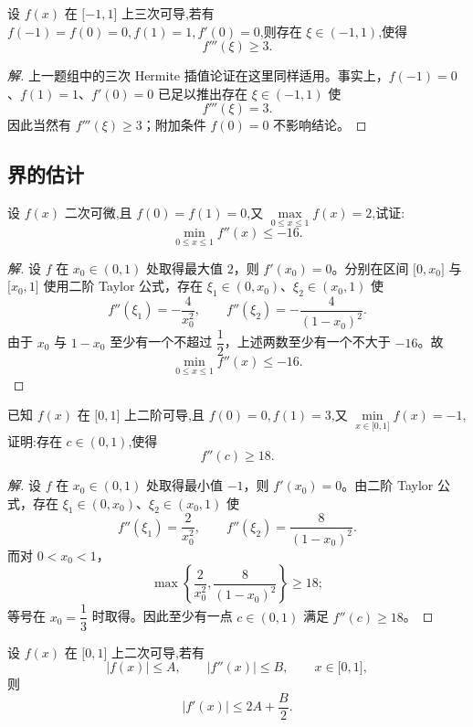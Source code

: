 \documentclass[../../数学分析培优讲义(答案版).tex]{subfiles}
\begin{document}
\begin{example}
设 $f(x)$ 在 $\lbrack -1,1\rbrack$ 上三次可导,若有 $f(-1)=f(0)=0,f(1)=1,f'(0)=0$,则存在 $\xi\in(-1,1)$,使得
\[
    f'''(\xi)\geq 3.
\]
\end{example}

\begin{proof}[解]
上一题组中的三次 Hermite 插值论证在这里同样适用。事实上，$f(-1)=0$、$f(1)=1$、$f'(0)=0$ 已足以推出存在 $\xi\in(-1,1)$ 使
\[
    f'''(\xi)=3.
\]
因此当然有 $f'''(\xi)\geq3$；附加条件 $f(0)=0$ 不影响结论。
\end{proof}

\subsection{界的估计}

\begin{example}
设 $f(x)$ 二次可微,且 $f(0)=f(1)=0$,又
$\displaystyle\max\limits_{0\leq x\leq1}f(x)=2$,试证:
\[
    \min\limits_{0\leq x\leq1}f''(x)\leq-16.
\]
\end{example}

\begin{proof}[解]
设 $f$ 在 $x_0\in(0,1)$ 处取得最大值 $2$，则 $f'(x_0)=0$。分别在区间 $\lbrack0,x_0\rbrack$ 与 $\lbrack x_0,1\rbrack$ 使用二阶 Taylor 公式，存在 $\xi_1\in(0,x_0)$、$\xi_2\in(x_0,1)$ 使
\[
    f''(\xi_1)=-\dfrac{4}{x_0^2},
    \qquad
    f''(\xi_2)=-\dfrac{4}{(1-x_0)^2}.
\]
由于 $x_0$ 与 $1-x_0$ 至少有一个不超过 $\dfrac{1}{2}$，上述两数至少有一个不大于 $-16$。故
\[
    \min\limits_{0\leq x\leq1}f''(x)\leq-16.
\]
\end{proof}

\begin{example}
已知 $f(x)$ 在 $\lbrack 0,1\rbrack$ 上二阶可导,且 $f(0)=0,f(1)=3$,又
$\displaystyle\min\limits_{x\in\lbrack 0,1\rbrack}f(x)=-1$,证明:存在 $c\in(0,1)$,使得
\[
    f''(c)\geq18.
\]
\end{example}

\begin{proof}[解]
设 $f$ 在 $x_0\in(0,1)$ 处取得最小值 $-1$，则 $f'(x_0)=0$。由二阶 Taylor 公式，存在 $\xi_1\in(0,x_0)$、$\xi_2\in(x_0,1)$ 使
\[
    f''(\xi_1)=\dfrac{2}{x_0^2},
    \qquad
    f''(\xi_2)=\dfrac{8}{(1-x_0)^2}.
\]
而对 $0<x_0<1$，
\[
    \max\left\{\dfrac{2}{x_0^2},\dfrac{8}{(1-x_0)^2}\right\}\geq18;
\]
等号在 $x_0=\dfrac{1}{3}$ 时取得。因此至少有一点 $c\in(0,1)$ 满足 $f''(c)\geq18$。
\end{proof}

\begin{example}[\markstar]
设 $f(x)$ 在 $\lbrack 0,1\rbrack$ 上二次可导,若有
\[
    |f(x)|\leq A,\qquad |f''(x)|\leq B,\qquad x\in\lbrack 0,1\rbrack,
\]
则
\[
    |f'(x)|\leq2A+\dfrac{B}{2}.
\]
\end{example}
\end{document}
